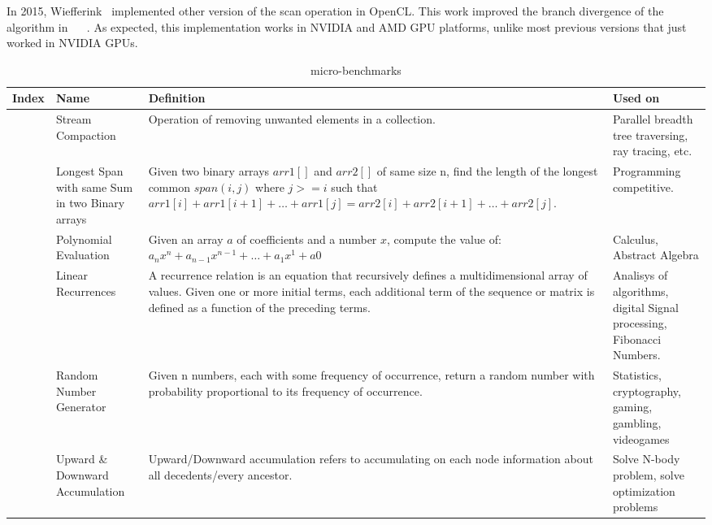 \documentclass[Ingles]{ic-tese-v1}
\begin{document}
In 2015, Wiefferink~\cite{ScanOpenCL} implemented other version of the
scan operation in OpenCL.  This work improved the branch divergence of
the  algorithm in  ~\cite{ScanAsPrimitive} ~\cite{harris2007parallel}.
As  expected,  this  implementation  works   in  NVIDIA  and  AMD  GPU
platforms, unlike  most previous versions  that just worked  in NVIDIA
GPUs.

\begin{table}[!t]
	\centering
	\caption[small]{micro-benchmarks}
	\begin{adjustbox}{max width=1.1\textwidth, center}
		\begin{tabular}{|>{\centering\arraybackslash}p{0.8cm}|p{5cm}|p{9cm}|p{5cm}|} \hline
			Index  & Name & Definition & Used  on \\ \hline
			1 & Stream  Compaction
			& Operation of removing unwanted elements in  a collection.
			& Parallel breadth tree  traversing, ray tracing, etc.\\ \hline
			2  & Longest Span with same Sum in two Binary arrays
			& Given two binary arrays $arr1[]$ and $arr2[]$ of same size n, find the
			length of the longest common $span (i, j)$ where $j >= i$ such that
			$arr1[i] + arr1[i+1] + \dotso + arr1[j] = arr2[i] + arr2[i+1] + \dotso +
			arr2[j]$. 
			& Programming competitive.\\ \hline
			3 & Polynomial Evaluation 
			& Given an array $a$ of coefficients and a number  $x$,   compute  the   value  of:
			$a_nx^n  + a_{n-1}x^{n-1}  + \dotso  +  a_1x^1 + a0$
			& Calculus,  Abstract  Algebra\\ \hline
			4 & Linear Recurrences
			& A recurrence relation is an equation that
			recursively  defines  a  multidimensional
			array  of  values.   Given  one  or  more
			initial  terms, each  additional term  of
			the sequence  or matrix  is defined  as a
			function   of   the   preceding   terms.  
			& Analisys  of  algorithms,  digital Signal  processing,  Fibonacci Numbers.\\ \hline
			5  & Random  Number Generator
			& Given  n numbers,  each with  some
			frequency  of  occurrence, return  a
			random  number  with  probability
			proportional to its
			frequency of occurrence.
			& Statistics, cryptography, gaming, gambling, videogames\\ \hline
			6   & Upward \&  Downward Accumulation
			& Upward/Downward accumulation refers  to   accumulating  on
			each node  information about all decedents/every ancestor.
			& Solve  N-body  problem,  solve    optimization  problems

\end{tabular}
\end{adjustbox}
\end{table}
\end{document}
